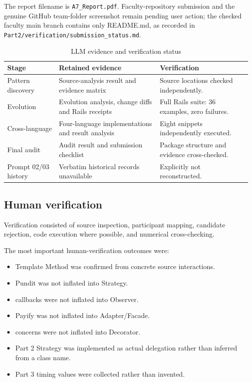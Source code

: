 \documentclass[10pt,a4paper]{article}
\newcommand{\code}[1]{\texttt{\small #1}}
\begin{document}
The report filename is \texttt{A7\_Report.pdf}. Faculty-repository submission and the genuine GitHub team-folder screenshot remain pending user action; the checked faculty main branch contains only README.md, as recorded in \code{Part2/verification/submission\_status.md}.

\begin{table}[H]
\centering
\caption{LLM evidence and verification status}
\label{tab:llm}
\begin{tabularx}{\linewidth}{lXX}
\toprule
Stage & Retained evidence & Verification\\
\midrule
Pattern discovery & Source-analysis result and evidence matrix & Source locations checked independently.\\
Evolution & Evolution analysis, change diffs and Rails receipts & Full Rails suite: 36 examples, zero failures.\\
Cross-language & Four-language implementations and result analysis & Eight snippets independently executed.\\
Final audit & Audit result and submission checklist & Package structure and evidence cross-checked.\\
Prompt 02/03 history & Verbatim historical records unavailable & Explicitly not reconstructed.\\
\bottomrule
\end{tabularx}
\end{table}

\subsection{Human verification}

Verification consisted of source inspection, participant mapping, candidate rejection, code execution where possible, and numerical cross-checking.

The most important human-verification outcomes were:

\begin{itemize}[leftmargin=*]
\item Template Method was confirmed from concrete source interactions.
\item Pundit was not inflated into Strategy.
\item callbacks were not inflated into Observer.
\item Payify was not inflated into Adapter/Facade.
\item concerns were not inflated into Decorator.
\item Part 2 Strategy was implemented as actual delegation rather than inferred from a class name.
\item Part 3 timing values were collected rather than invented.
\end{itemize}
\end{document}
